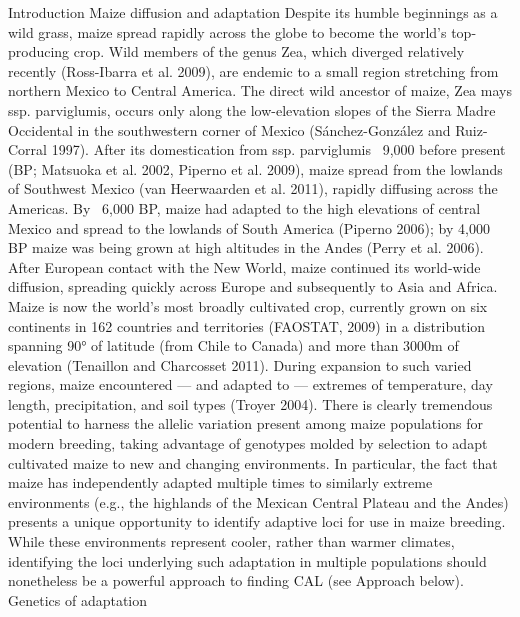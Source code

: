 Introduction
Maize diffusion and adaptation
Despite its humble beginnings as a wild grass, maize spread rapidly across the globe to become the world’s top-producing crop.  Wild members of the genus Zea, which diverged relatively recently (Ross-Ibarra et al. 2009), are endemic to a small region stretching from northern Mexico to Central America. The direct wild ancestor of maize, Zea mays ssp. parviglumis, occurs only along the low-elevation slopes of the Sierra Madre Occidental in the southwestern corner of Mexico (Sánchez-González and Ruiz-Corral 1997).  After its domestication from ssp. parviglumis ~9,000 before present (BP; Matsuoka et al. 2002, Piperno et al. 2009), maize spread from the lowlands of Southwest Mexico (van Heerwaarden et al. 2011), rapidly diffusing across the Americas.  By ~6,000 BP, maize had adapted to the high elevations of central Mexico and spread to the lowlands of South America (Piperno 2006); by 4,000 BP maize was being grown at high altitudes in the Andes (Perry et al. 2006). After European contact with the New World, maize continued its world-wide diffusion, spreading quickly across Europe and subsequently to Asia and Africa.  Maize is now the world’s most broadly cultivated crop, currently grown on six continents in 162 countries and territories (FAOSTAT, 2009) in a distribution spanning 90° of latitude (from Chile to Canada) and more than 3000m of elevation (Tenaillon and Charcosset 2011).  During expansion to such varied regions, maize encountered — and adapted to — extremes of temperature, day length, precipitation, and soil types (Troyer 2004).  
There is clearly tremendous potential to harness the allelic variation present among maize populations for modern breeding, taking advantage of genotypes molded by selection to adapt cultivated maize to new and changing environments.  In particular, the fact that maize has independently adapted multiple times to similarly extreme environments (e.g., the highlands of the Mexican Central Plateau and the Andes) presents a unique opportunity to identify adaptive loci for use in maize breeding.  While these environments represent cooler, rather than warmer climates, identifying the loci underlying such adaptation in multiple populations should nonetheless be a powerful approach to finding CAL (see Approach below).
Genetics of adaptation

